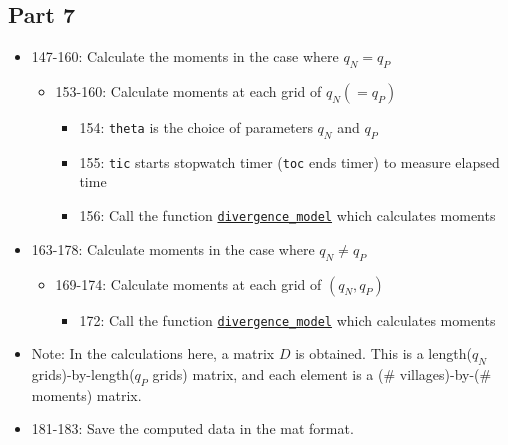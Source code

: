 \documentclass[10pt,letterpaper]{article}
\begin{document}
\subsection*{Part 7}
\begin{itemize}
  \item 147-160: Calculate the moments in the case where $q_N = q_P$
    \begin{itemize}
      \item 153-160: Calculate moments at each grid of $q_N (= q_P)$
        \begin{itemize}
          \item 154: \texttt{theta} is the choice of parameters $q_N$ and $q_P$
          \item 155: \texttt{tic} starts stopwatch timer (\texttt{toc} ends timer) to measure elapsed time
          \item 156: Call the function \hyperref[divergence_model]{\texttt{divergence\_model}} which calculates moments
        \end{itemize}
    \end{itemize}
  \item 163-178: Calculate moments in the case where $q_N \ne q_P$
    \begin{itemize}
      \item 169-174: Calculate moments at each grid of $(q_N, q_P)$
        \begin{itemize}
          \item 172: Call the function \hyperref[divergence_model]{\texttt{divergence\_model}} which calculates moments
        \end{itemize}
    \end{itemize}
  \item Note: In the calculations here, a matrix $D$ is obtained.
    This is a length($q_N$ grids)-by-length($q_P$ grids) matrix, and each element is a (\# villages)-by-(\# moments) matrix.
  \item 181-183: Save the computed data in the mat format.
\end{itemize}
\end{document}
